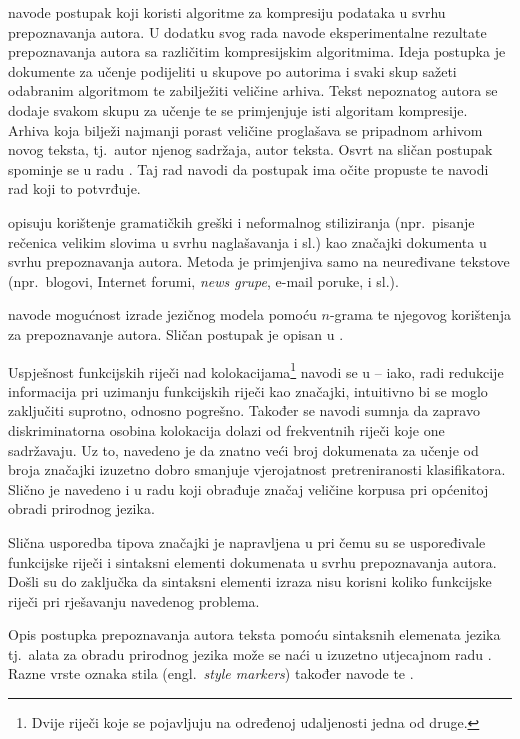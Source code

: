 \documentclass{article}
\newcommand{\engl}[1]{(engl.~\emph{#1})}
\begin{document}
\citet{kukushkina2001using} navode postupak koji koristi algoritme za kompresiju
podataka u svrhu prepoznavanja autora. U dodatku svog rada navode eksperimentalne
rezultate prepoznavanja autora sa različitim kompresijskim algoritmima. Ideja
postupka je dokumente za učenje podijeliti u skupove po autorima i svaki skup
sažeti odabranim algoritmom te zabilježiti veličine arhiva. Tekst nepoznatog
autora se dodaje svakom skupu za učenje te se primjenjuje isti algoritam
kompresije. Arhiva koja bilježi najmanji porast veličine proglašava se
pripadnom arhivom novog teksta, tj.~autor njenog sadržaja, autor teksta. Osvrt
na sličan postupak spominje se u radu \citep{zhao2005effective}. Taj rad navodi
da postupak ima očite propuste te navodi rad koji to potvrđuje.

\citet{koppel2003exploiting} opisuju korištenje gramatičkih greški i
neformalnog stiliziranja (npr.~pisanje rečenica velikim slovima u svrhu
naglašavanja i sl.) kao značajki dokumenta u svrhu prepoznavanja autora. Metoda
je primjenjiva samo na neuređivane tekstove (npr.~blogovi, Internet forumi,
\emph{news grupe}, e-mail poruke, i sl.).

\citet{peng2003language} navode mogućnost izrade jezičnog modela pomoću $n$-grama te
njegovog korištenja za prepoznavanje autora. Sličan postupak je opisan u
\citep{coyotl2006authorship}.

Uspješnost funkcijskih riječi nad kolokacijama\footnote{Dvije riječi koje se
pojavljuju na određenoj udaljenosti jedna od druge.} navodi se u
\citep{argamon2005measuring} -- iako, radi redukcije informacija pri uzimanju
funkcijskih riječi kao značajki, intuitivno bi se moglo zaključiti suprotno,
odnosno pogrešno. Također se navodi sumnja da zapravo diskriminatorna osobina
kolokacija dolazi od frekventnih riječi koje one sadržavaju. Uz to, navedeno je da znatno veći
broj dokumenata za učenje od broja značajki izuzetno dobro smanjuje
vjerojatnost pretreniranosti klasifikatora. Slično je navedeno i u
radu \citep{banko2001scaling} koji obrađuje značaj veličine korpusa pri
općenitoj obradi prirodnog jezika.

Slična usporedba tipova značajki je napravljena u \citep{uzuner2005comparative}
pri čemu su se uspoređivale funkcijske riječi i sintaksni elementi dokumenata u
svrhu prepoznavanja autora. Došli su do zaključka da sintaksni elementi izraza
nisu korisni koliko funkcijske riječi pri rješavanju navedenog problema.

Opis postupka prepoznavanja autora teksta pomoću sintaksnih elemenata jezika
tj.~alata za obradu prirodnog jezika može se naći u izuzetno utjecajnom radu
\citep{stamatatos2001computer}. Razne vrste oznaka stila \engl{style markers}
također navode \citet{diri2003automatic} te \citet{luyckx2005shallow}.
\end{document}
